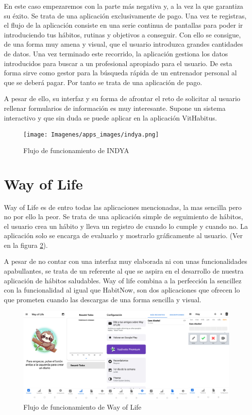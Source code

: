 En este caso empezaremos con la parte más negativa y, a la vez la que garantiza su éxito. Se trata de una aplicación exclusivamente de pago.
Una vez te registras, el flujo de la aplicación consiste en una serie continua de pantallas para poder ir introduciendo tus hábitos, rutinas y objetivos a conseguir. Con ello se consigue, de una forma muy amena y visual, que el usuario introduzca grandes cantidades de datos. Una vez terminado este recorrido, la aplicación gestiona los datos introducidos para buscar a un profesional apropiado para el usuario. De esta forma sirve como gestor para la búsqueda rápida de un entrenador personal al que se deberá pagar. Por tanto se trata de una aplicación de pago.

A pesar de ello, su interfaz y su forma de afrontar el reto de solicitar al usuario rellenar formularios de información es muy interesante. Supone un sistema interactivo y que sin duda se puede aplicar en la aplicación VitHabitus.
\begin{figure}[h]
	\centering
	\texttt{[image: Imagenes/apps\_images/indya.png]}
	\caption{Flujo de funcionamiento de INDYA}
	\label{fig:INDYA}
\end{figure}

\section{Way of Life}

Way of Life es de entro todas las aplicaciones mencionadas, la mas sencilla pero no por ello la peor. Se trata de una aplicación simple de seguimiento de hábitos, el usuario crea un hábito y lleva un registro de cuando lo cumple y cuando no. La aplicación solo se encarga de  evaluarlo y mostrarlo gráficamente al usuario. (Ver en la figura \ref{fig:Way of Life}).

A pesar de no contar con una interfaz muy elaborada ni con unas funcionalidades apabullantes, se trata de un referente al que se aspira en el desarrollo de nuestra aplicación de hábitos saludables. Way of life combina a la perfección la sencillez con la funcionalidad al igual que HabitNow, son dos aplicaciones que ofrecen lo que prometen cuando las descargas de una forma sencilla y visual.\\

\begin{figure}[h]
	\centering
	\includegraphics[width = 1\textwidth]{Imagenes/apps_images/way_of_life.png}
	\caption{Flujo de funcionamiento de Way of Life}
	\label{fig:Way of Life}
\end{figure}

